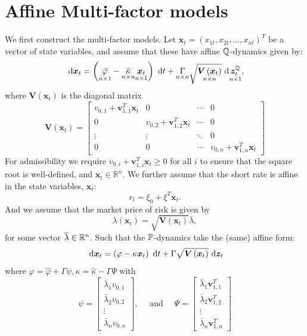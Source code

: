 \section{Affine Multi-factor models}
We first construct the multi-factor models. Let $\boldsymbol{x}_{t}=\left(x_{1 t}, x_{2 t}, \ldots,
x_{n t}\right)^{T}$ be a vector of state variables, and assume that these have affine $\Q$-dynamics
given by: 
\[
  \d  \boldsymbol{x}_{t}=
  \left(\underset{n\times 1}{\hat{\varphi}}-\underset{n\times n}{\hat{\kappa}} \underset{n \times
  1}{\boldsymbol{x}_{t}}\right) \d  t+\underset{n \times  n}{\Gamma }\sqrt{\underset{n\times
n}{\boldsymbol{V}\left(\boldsymbol{x}_{t}\right)}} \d  \underset{n \times
1}{\boldsymbol{z}_{t}^{\Q}}
,\]
where $\boldsymbol{V}\left(\boldsymbol{x}_{t}\right)$ is the diagonal matrix
\[
\boldsymbol{V}\left(\boldsymbol{x}_{t}\right)=\left[\begin{array}{cccc}
v_{0,1}+\mathbf{v}_{1,1}^{T} \boldsymbol{x}_{t} & 0 & \cdots & 0 \\
0 & v_{0,2}+\mathbf{v}_{1,2}^{T} \boldsymbol{x}_{t} & \cdots & 0 \\
\vdots & \vdots & \ddots & 0 \\
0 & 0 & \cdots & v_{0, n}+\mathbf{v}_{1, n}^{T} \boldsymbol{x}_{t}
\end{array}\right]
\]
For admissibility we require $v_{0, i}+\mathbf{v}_{1, i}^{T} \boldsymbol{x}_{t} \geq 0$ for all $i$
to ensure that the square root is well-defined, and $\boldsymbol{x}_{t} \in \mathbb{R}^{n}$. We
further assume that the short rate is affine in the state variables, $\bm{x}_t$:
\[
r_{t}=\xi_{0}+\xi^{T} \boldsymbol{x}_{t}
.\]
And we assume that the market price of risk is given by
\[
\lambda\left(\boldsymbol{x}_{t}\right)=\sqrt{\boldsymbol{V}\left(\boldsymbol{x}_{t}\right)} \bar{\lambda}
,\]
for some vector $\overline{\lambda} \in \R^{n}$. 
Such that the $\P$-dynamics take the (same) affine form:
\[
\d  \boldsymbol{x}_{t}=\left(\varphi-\kappa \boldsymbol{x}_{t}\right) \d  t+\Gamma \sqrt{\boldsymbol{V}\left(\boldsymbol{x}_{t}\right)} \d  \boldsymbol{z}_{t}
\]
where $\varphi=\hat{\varphi}+\Gamma \psi, \kappa=\hat{\kappa}-\Gamma \Psi$ with
\[
\psi=\left[\begin{array}{c}
\bar{\lambda}_{1} v_{0,1} \\
\bar{\lambda}_{2} v_{0,2} \\
\vdots \\
\bar{\lambda}_{n} v_{0, n}
\end{array}\right], \quad \text { and } \quad \Psi=\left[\begin{array}{c}
\bar{\lambda}_{1} \mathbf{v}_{1,1}^{T} \\
\bar{\lambda}_{2} \mathbf{v}_{1,2}^{T} \\
\vdots \\
\bar{\lambda}_{n} \mathbf{v}_{1, n}^{T}
\end{array}\right]
\]

